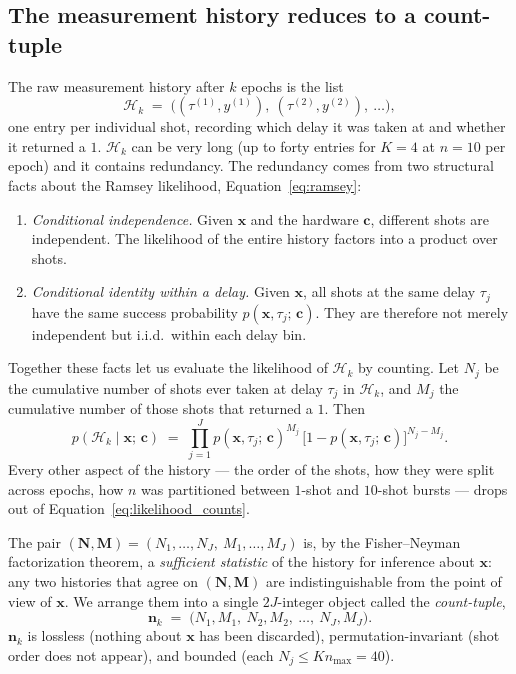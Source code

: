 \documentclass[11pt]{article}
\newcommand{\bc}{\bm{c}}
\newcommand{\bx}{\bm{x}}
\begin{document}
\subsection{The measurement history reduces to a count-tuple}

The raw measurement history after $k$ epochs is the list
\begin{equation}
\mathcal{H}_k \;=\; \bigl( (\tau^{(1)}, y^{(1)}),\ (\tau^{(2)}, y^{(2)}),\ \ldots \bigr),
\end{equation}
one entry per individual shot, recording which delay it was taken at and whether it returned a $1$.  $\mathcal{H}_k$ can be very long (up to forty entries for $K = 4$ at $n = 10$ per epoch) and it contains redundancy.  The redundancy comes from two structural facts about the Ramsey likelihood, Equation~\eqref{eq:ramsey}:

\begin{enumerate}[nosep, leftmargin=*]
\item \emph{Conditional independence.}  Given $\bx$ and the hardware $\bc$, different shots are independent.  The likelihood of the entire history factors into a product over shots.
\item \emph{Conditional identity within a delay.}  Given $\bx$, all shots at the same delay $\tau_j$ have the same success probability $p(\bx, \tau_j;\, \bc)$.  They are therefore not merely independent but i.i.d.\ within each delay bin.
\end{enumerate}

Together these facts let us evaluate the likelihood of $\mathcal{H}_k$ by counting.  Let $N_j$ be the cumulative number of shots ever taken at delay $\tau_j$ in $\mathcal{H}_k$, and $M_j$ the cumulative number of those shots that returned a $1$.  Then
\begin{equation}
p(\mathcal{H}_k \mid \bx;\, \bc) \;=\; \prod_{j=1}^J p(\bx, \tau_j;\, \bc)^{M_j}\, \bigl[1 - p(\bx, \tau_j;\, \bc)\bigr]^{N_j - M_j}.
\label{eq:likelihood_counts}
\end{equation}
Every other aspect of the history --- the order of the shots, how they were split across epochs, how $n$ was partitioned between $1$-shot and $10$-shot bursts --- drops out of Equation~\eqref{eq:likelihood_counts}.

The pair $(\mathbf{N}, \mathbf{M}) = (N_1, \ldots, N_J,\ M_1, \ldots, M_J)$ is, by the Fisher--Neyman factorization theorem, a \emph{sufficient statistic} of the history for inference about $\bx$: any two histories that agree on $(\mathbf{N}, \mathbf{M})$ are indistinguishable from the point of view of $\bx$.  We arrange them into a single $2J$-integer object called the \emph{count-tuple},
\begin{equation}
\mathbf{n}_k \;=\; \bigl(N_1, M_1,\ N_2, M_2,\ \ldots,\ N_J, M_J\bigr).
\label{eq:count_tuple}
\end{equation}
$\mathbf{n}_k$ is lossless (nothing about $\bx$ has been discarded), permutation-invariant (shot order does not appear), and bounded (each $N_j \le Kn_{\max} = 40$).
\end{document}
